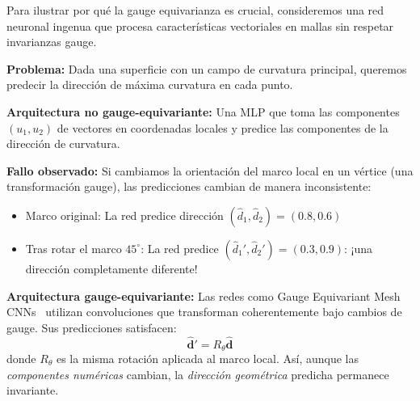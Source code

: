 \begin{example}\label{ex:impacto_gauge_predicciones}
Para ilustrar por qué la gauge equivarianza es crucial, consideremos una red neuronal ingenua que procesa características vectoriales en mallas sin respetar invarianzas gauge.

\textbf{Problema:} Dada una superficie con un campo de curvatura principal, queremos predecir la dirección de máxima curvatura en cada punto.

\textbf{Arquitectura no gauge-equivariante:} Una \gls{MLP} que toma las componentes $(u_1, u_2)$ de vectores en coordenadas locales y predice las componentes de la dirección de curvatura.

\textbf{Fallo observado:} Si cambiamos la orientación del marco local en un vértice (una transformación gauge), las predicciones cambian de manera inconsistente:
\begin{itemize}
    \item Marco original: La red predice dirección $(\hat{d}_1, \hat{d}_2) = (0.8, 0.6)$
    \item Tras rotar el marco $45^\circ$: La red predice $(\hat{d}_1', \hat{d}_2') = (0.3, 0.9)$: ¡una dirección completamente diferente!
\end{itemize}

\textbf{Arquitectura gauge-equivariante:} Las redes como Gauge Equivariant Mesh CNNs~\citep{cohen2019gaugeequivariantconvolutional} utilizan convoluciones que transforman coherentemente bajo cambios de gauge. Sus predicciones satisfacen:
\begin{equation}
\hat{\mathbf{d}}' = R_\theta \hat{\mathbf{d}}
\end{equation}
donde $R_\theta$ es la misma rotación aplicada al marco local. Así, aunque las \textit{componentes numéricas} cambian, la \textit{dirección geométrica} predicha permanece invariante.
\end{example}

